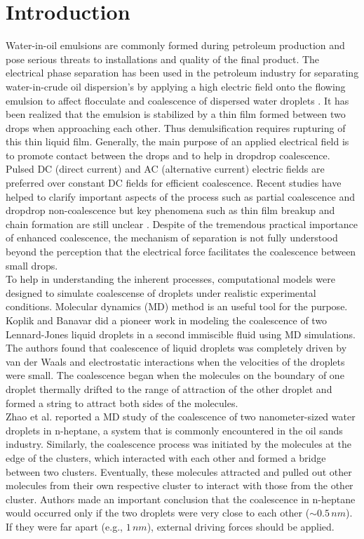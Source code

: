 \section{Introduction}
Water-in-oil emulsions are commonly formed during petroleum production and pose serious threats to installations and quality of the final product. The electrical phase separation has been used in the petroleum industry for separating water-in-crude oil dispersion's by applying a high electric field onto the flowing emulsion to affect flocculate and coalescence of dispersed water droplets \cite{Cottrell1991,eow02}.
It has been realized that the emulsion is stabilized by a thin film formed between two drops when approaching each other. Thus demulsification requires rupturing of this thin liquid film. 
Generally, the main purpose of an applied electrical field is to promote contact between the drops and to help in drop\textendash drop coalescence. Pulsed DC (direct current) and AC (alternative current) electric fields are preferred over constant DC fields for efficient coalescence. Recent studies have helped to clarify important aspects of the process such as partial coalescence and drop\textendash drop non-coalescence but key phenomena such as thin film breakup and chain formation are still unclear \cite{Mhatre2015}.
Despite of the tremendous practical importance of enhanced coalescence, the mechanism of separation  is not fully understood \cite{Isaacs01} beyond the  perception that the electrical force facilitates the coalescence between small drops.\\
To help in understanding the inherent processes, computational models were designed  to simulate coalescense of droplets under realistic experimental conditions. Molecular dynamics (MD) method is an useful tool for the purpose.  Koplik and Banavar \cite{Koplik2} did a pioneer work in modeling the coalescence of two Lennard-Jones liquid droplets in a second immiscible fluid using MD simulations. The authors found that coalescence of liquid droplets  was completely driven by van der Waals and electrostatic interactions when the velocities of the droplets were small. The coalescence began when the molecules on the boundary of one droplet thermally drifted to the range of attraction of the other droplet and formed a string to attract both sides of the molecules. \\
Zhao et al.\cite{Zhao2004} reported a MD study of the coalescence of two nanometer-sized water droplets in n-heptane, a system that is commonly encountered in the oil sands industry. Similarly, the coalescence process was initiated by the molecules at the edge of the clusters, which interacted with each other and formed a bridge between two clusters. Eventually, these molecules attracted and pulled out other molecules from their own respective cluster to interact with those from the other cluster. Authors made an important conclusion that the coalescence in n-heptane would occurred only if the two droplets were very close to each other ($\sim 0.5\, nm$). If they were far apart (e.g., $1\, nm$), external driving forces should be applied. 

